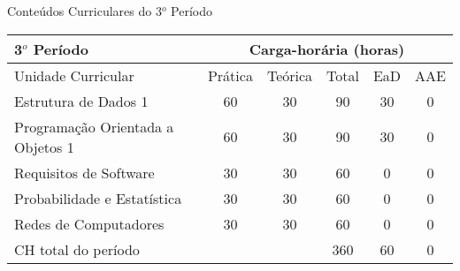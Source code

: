\begin{quadro}[ht!]
\centering
\caption{Conteúdos Curriculares do 3$^o$ Período}\label{qua:periodo3}
\begin{tabular}{|p{8.0cm}|c|c|c|c|c|}
\hline
\rowcolor{blue1} 3$^o$ Período & \multicolumn{5}{|c|}{\centering Carga-horária (horas)} \\ \hline
\rowcolor{blue1} Unidade Curricular & Prática & Teórica & Total & EaD & AAE \\ \hline
Estrutura de Dados 1 & 60 & 30 & 90 & 30	&	0 \\	\hline
Programação Orientada a Objetos 1  & 60 & 30 & 90 & 30	&	0 \\	\hline
Requisitos de Software & 30 & 30 & 60 & 0	&	0 \\	\hline
Probabilidade e Estatística & 30 & 30 & 60 & 0	&	0 \\	\hline
Redes de Computadores & 30 & 30 & 60 & 0	&	0 \\	\hline
CH total do período & \multicolumn{2}{p{3.3cm}|}{\cellcolor{blue1}} & 360 & 60	&	0 \\ \hline
\end{tabular} \end{quadro}